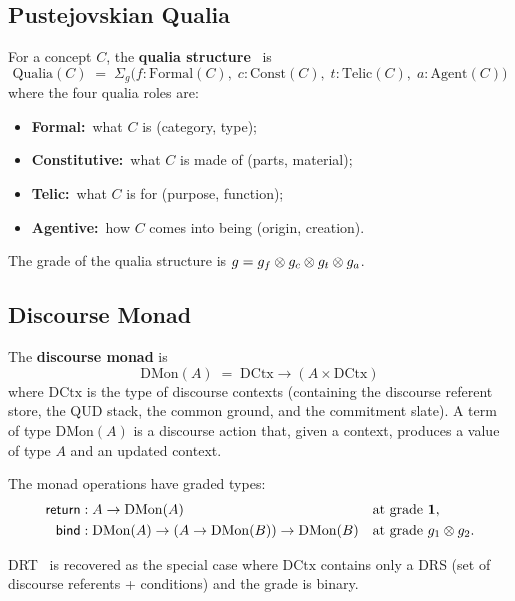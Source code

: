 \subsection{Pustejovskian Qualia}
\label{subsec:qualia}

\begin{definition}
\label{def:qualia}
For a concept $C$, the \textbf{qualia structure}~\cite{pustejovsky1995} is
\[
  \mathrm{Qualia}(C) \;=\;
  \Sigma_g\bigl(
    f : \mathrm{Formal}(C),\;
    c : \mathrm{Const}(C),\;
    t : \mathrm{Telic}(C),\;
    a : \mathrm{Agent}(C)
  \bigr)
\]
where the four qualia roles are:
\begin{itemize}[nosep]
\item \textbf{Formal:}\ what $C$ is (category, type);
\item \textbf{Constitutive:}\ what $C$ is made of (parts, material);
\item \textbf{Telic:}\ what $C$ is for (purpose, function);
\item \textbf{Agentive:}\ how $C$ comes into being (origin, creation).
\end{itemize}
The grade of the qualia structure is
$g = g_f \otimes g_c \otimes g_t \otimes g_a$.
\end{definition}

\subsection{Discourse Monad}
\label{subsec:dmon}

\begin{definition}
\label{def:dmon}
The \textbf{discourse monad} is
\[
  \mathrm{DMon}(A) \;=\; \mathrm{DCtx} \to (A \times \mathrm{DCtx})
\]
where $\mathrm{DCtx}$ is the type of discourse contexts (containing
the discourse referent store, the QUD stack, the common ground, and
the commitment slate).  A term of type $\mathrm{DMon}(A)$ is a
discourse action that, given a context, produces a value of type $A$
and an updated context.

The monad operations have graded types:
\begin{align*}
  \mathsf{return} &: A \to \mathrm{DMon}(A) &&\text{at grade } \mathbf{1}, \\
  \mathsf{bind} &: \mathrm{DMon}(A) \to (A \to \mathrm{DMon}(B))
  \to \mathrm{DMon}(B) &&\text{at grade } g_1 \otimes g_2.
\end{align*}
\end{definition}

\begin{example}
DRT~\cite{kamp1993} is recovered as the special case where
$\mathrm{DCtx}$ contains only a DRS (set of discourse referents +
conditions) and the grade is binary.
\end{example}


